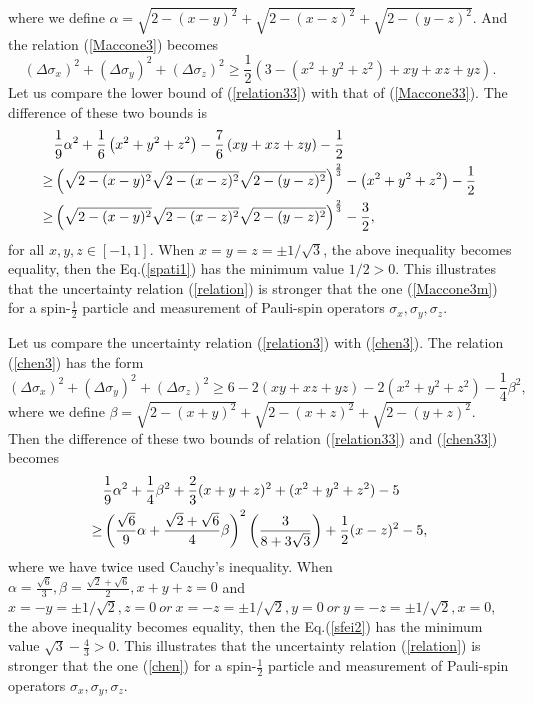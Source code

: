 \documentclass[fleqn,10pt]{wlscirep}
\begin{document}
where we define $\alpha=\sqrt{2-(x-y)^2}+\sqrt{2-(x-z)^2}+\sqrt{2-(y-z)^2}$. And the relation (\ref{Maccone3}) becomes
\begin{equation}\label{Maccone33}
(\Delta \sigma_{x})^{2}+(\Delta \sigma_{y})^{2}+(\Delta \sigma_{z})^{2}
\geq\frac{1}{2} \left(3-(x^2+y^2+z^2)+xy+xz+yz\right).
\end{equation}
Let us compare the lower bound of (\ref{relation33}) with that of (\ref{Maccone33}). The difference of these two bounds is
%
%
\begin{align}\label{spati1}
&\frac{1}{9}\alpha^2
+\frac{1}{6}\left(x^2+y^2+z^2\right)-\frac{7}{6}\left(xy+xz+zy\right)-\frac{1}{2}\\
\geq&\left(\sqrt{2-(x-y)^2}\sqrt{2-(x-z)^2}\sqrt{2-(y-z)^2}\right)^{\frac{2}{3}}-\left(x^2+y^2+z^2\right)-\frac{1}{2}\notag\\
\geq&\left(\sqrt{2-(x-y)^2}\sqrt{2-(x-z)^2}\sqrt{2-(y-z)^2}\right)^{\frac{2}{3}}-\frac{3}{2}\notag,
\end{align}
%
for all $x,y,z\in[-1,1]$. When $x=y=z=\pm1/\sqrt{3}$, the above inequality becomes equality,
then the Eq.(\ref{spati1}) has the minimum value $1/2>0$.
This illustrates that the uncertainty relation (\ref{relation}) is stronger that the one (\ref{Maccone3m}) for a spin-$\frac{1}{2}$ particle and measurement of Pauli-spin operators $\sigma_x,\sigma_y,\sigma_z$.

Let us compare the uncertainty relation (\ref{relation3}) with (\ref{chen3}). The relation (\ref{chen3}) has the form
%
\begin{equation}\label{chen33}
(\Delta \sigma_{x})^{2}+(\Delta \sigma_{y})^{2}+(\Delta \sigma_{z})^{2}
\geq 6-2(xy+xz+yz)-2(x^2+y^2+z^2)-\frac{1}{4}\beta^2,
\end{equation}
%
where we define $\beta=\sqrt{2-(x+y)^2}+\sqrt{2-(x+z)^2}+\sqrt{2-(y+z)^2}$.
Then the difference of these two bounds of relation (\ref{relation33}) and (\ref{chen33}) becomes
%
%
\begin{align}\label{sfei2}
&\frac{1}{9}\alpha^2+\frac{1}{4}\beta^2+\frac{2}{3}(x+y+z)^2+(x^2+y^2+z^2)-5\\
\geq&\left(\frac{\sqrt{6}}{9}\alpha+\frac{\sqrt{2}+\sqrt{6}}{4}\beta\right)^2
\left(\frac{3}{8+3\sqrt{3}}\right)
+\frac{1}{2}(x-z)^2-5\notag,
\end{align}
%
where we have twice used Cauchy's inequality. When $\alpha=\frac{\sqrt{6}}{3},\beta=\frac{\sqrt{2}+\sqrt{6}}{2},x+y+z=0$ and
$x=-y=\pm1/\sqrt{2},z=0~ or ~x=-z=\pm1/\sqrt{2},y=0 ~or ~y=-z=\pm1/\sqrt{2},x=0$, the above inequality becomes equality,
then the Eq.(\ref{sfei2}) has the minimum value $\sqrt{3}-\frac{4}{3}>0$.
This illustrates that the uncertainty relation (\ref{relation}) is stronger that the one (\ref{chen})
for a spin-$\frac{1}{2}$ particle and measurement of Pauli-spin operators $\sigma_x,\sigma_y,\sigma_z$.
\end{document}
